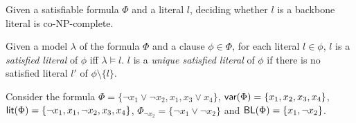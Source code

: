 \begin{theorem}
\label{thm:co-NP}\cite{Jan10}
Given a satisfiable formula $\Phi$ and a literal $l$, deciding whether $l$ is a backbone literal is co-NP-complete.
\end{theorem}


\begin{definition}
Given a model $\lambda$ of the formula $\Phi$ and a clause $\phi\in\Phi$, for each literal $l\in\phi$, $l$ is a \emph{satisfied literal}
of $\phi$ iff $\lambda\models l$. $l$ is a \emph{unique satisfied literal} of $\phi$ if there is no satisfied literal $l'$ of $\phi\setminus\{l\}$.
\end{definition}


Consider the formula $\Phi=\{\neg x_1 \vee \neg x_2, x_1, x_3 \vee x_4\}$,
$\textsf{var}(\Phi)=\{x_1, x_2, x_3, x_4\}$, $\textsf{lit}(\Phi)=\{\neg x_1, x_1, \neg x_2, x_3, x_4\}$, $\Phi_{\neg x_2}=\{\neg x_1 \vee \neg x_2\}$ and $\textsf{BL}(\Phi)=\{x_1, \neg x_2\}$.



